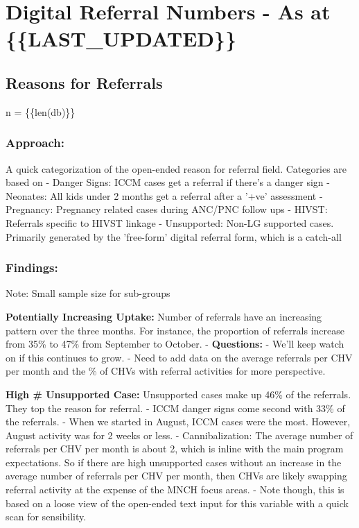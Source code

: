 \documentclass[11pt]{article}
\begin{document}
    \section{Digital Referral Numbers - As at
\{\{LAST\_UPDATED\}\}}\label{digital-referral-numbers---as-at-last_updated}

    \subsection{Reasons for Referrals}\label{reasons-for-referrals}

n = \{\{len(db)\}\}

\subsubsection{Approach:}\label{approach}

A quick categorization of the open-ended reason for referral field.
Categories are based on - Danger Signs: ICCM cases get a referral if
there's a danger sign - Neonates: All kids under 2 months get a referral
after a '+ve' assessment - Pregnancy: Pregnancy related cases during
ANC/PNC follow ups - HIVST: Referrals specific to HIVST linkage -
Unsupported: Non-LG supported cases. Primarily generated by the
'free-form' digital referral form, which is a catch-all

\subsubsection{Findings:}\label{findings}

Note: Small sample size for sub-groups

\textbf{Potentially Increasing Uptake:} Number of referrals have an
increasing pattern over the three months. For instance, the proportion
of referrals increase from 35\% to 47\% from September to October. -
\textbf{Questions:} - We'll keep watch on if this continues to grow. -
Need to add data on the average referrals per CHV per month and the \%
of CHVs with referral activities for more perspective.

\textbf{High \# Unsupported Case:} Unsupported cases make up 46\% of the
referrals. They top the reason for referral. - ICCM danger signs come
second with 33\% of the referrals. - When we started in August, ICCM
cases were the most. However, August activity was for 2 weeks or less. -
Cannibalization: The average number of referrals per CHV per month is
about 2, which is inline with the main program expectations. So if there
are high unsupported cases without an increase in the average number of
referrals per CHV per month, then CHVs are likely swapping referral
activity at the expense of the MNCH focus areas. - Note though, this is
based on a loose view of the open-ended text input for this variable
with a quick scan for sensibility.
\end{document}
